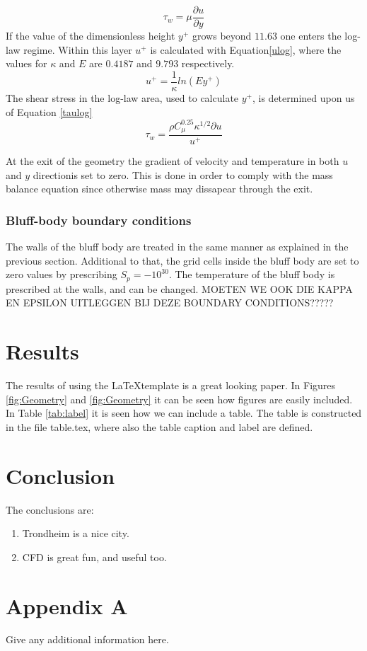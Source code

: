 \documentclass{CFD2017}
\begin{document}
\begin{equation}
\label{subtau}
\tau_w = \mu \frac{\partial u}{\partial y}
\end{equation}
If the value of the dimensionless height $y^+$ grows beyond $11.63$ one enters the log-law regime. Within this layer $u^+$ is calculated with Equation\ref{ulog}, where the values for $\kappa$ and $E$ are $0.4187$ and $9.793$ respectively.
\begin{equation}
\label{ulog}
u^+=\frac{1}{\kappa}ln(Ey^+)
\end{equation}
The shear stress in the log-law area, used to calculate $y^+$, is determined upon us of Equation \ref{taulog}
\begin{equation}
\label{taulog}
\tau_w = \frac{\rho C_{\mu}^{0.25}\kappa^{1/2}\partial u}{u^+}
\end{equation}


 At the exit of the geometry the gradient of velocity and temperature in both $u$ and $y$ directionis set to zero. This is done in order to comply with the mass balance equation since otherwise mass may dissapear through the exit.\\

\subsubsection{Bluff-body boundary conditions} \label{bluffBC}
The walls of the bluff body are treated in the same manner as explained in the previous section. Additional to that, the grid cells inside the bluff body are set to zero values by prescribing $S_p=-10^{30}$. The temperature of the bluff body is prescribed at the walls, and can be changed. MOETEN WE OOK DIE KAPPA EN EPSILON UITLEGGEN BIJ DEZE BOUNDARY CONDITIONS?????

 
\section{Results}
The results of using the \LaTeX template is a great looking paper.
In Figures \ref{fig:Geometry} and \ref{fig:Geometry} it can be seen how figures are easily included.
In Table \ref{tab:label} it is seen how we can include a table.
The table is constructed in the file table.tex, where also the table caption and label are defined.


\newpage
{}

\section{Conclusion}
The conclusions are:
\begin{enumerate}
  \item Trondheim is a nice city.
  \item CFD is great fun, and useful too.
\end{enumerate}






\newpage
\section{Appendix A}
Give any additional information here.
\end{document}

